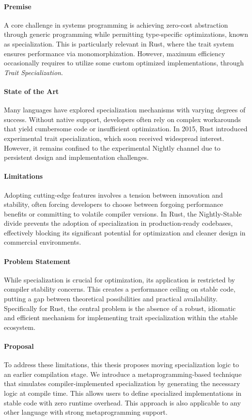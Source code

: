 \paragraph{Premise}
A core challenge in systems programming is achieving zero-cost abstraction through generic programming while permitting type-specific optimizations, known as specialization.
This is particularly relevant in Rust, where the trait system ensures performance via monomorphization.
However, maximum efficiency occasionally requires to utilize some custom optimized implementations, through \textit{Trait Specialization}.

\paragraph{State of the Art}
Many languages have explored specialization mechanisms with varying degrees of success.
Without native support, developers often rely on complex workarounds that yield cumbersome code or insufficient optimization.
In 2015, Rust introduced experimental trait specialization, which soon received widespread interest.
However, it remains confined to the experimental Nightly channel due to persistent design and implementation challenges.

\paragraph{Limitations}
Adopting cutting-edge features involves a tension between innovation and stability, often forcing developers to choose between forgoing performance benefits or committing to volatile compiler versions.
In Rust, the Nightly-Stable divide prevents the adoption of specialization in production-ready codebases, effectively blocking its significant potential for optimization and cleaner design in commercial environments.

\paragraph{Problem Statement}
While specialization is crucial for optimization, its application is restricted by compiler stability concerns.
This creates a performance ceiling on stable code, putting a gap between theoretical possibilities and practical availability.
Specifically for Rust, the central problem is the absence of a robust, idiomatic and efficient mechanism for implementing trait specialization within the stable ecosystem.

\paragraph{Proposal}
To address these limitations, this thesis proposes moving specialization logic to an earlier compilation stage.
We introduce a metaprogramming-based technique that simulates compiler-implemented specialization by generating the necessary logic at compile time.
This allows users to define specialized implementations in stable code with zero runtime overhead.
This approach is also applicable to any other language with strong metaprogramming support.

